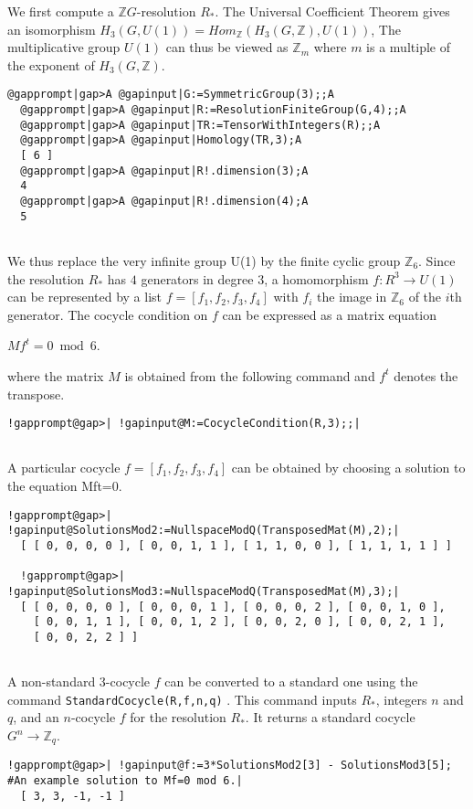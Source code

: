 \documentclass[a4paper,11pt]{report}
\begin{document}
{{ We first compute a $\mathbb ZG$-resolution $R_\ast$. The Universal Coefficient Theorem gives an isomorphism $H_3(G,U(1)) = Hom_{\mathbb Z}(H_3(G,\mathbb Z), U(1))$, The multiplicative group $U(1)$ can thus be viewed as $\mathbb Z_m$ where $m$ is a multiple of the exponent of $H_3(G,\mathbb Z)$. 
\begin{Verbatim}[commandchars=@|A,fontsize=\small,frame=single,label=Example]
  @gapprompt|gap>A @gapinput|G:=SymmetricGroup(3);;A
  @gapprompt|gap>A @gapinput|R:=ResolutionFiniteGroup(G,4);;A
  @gapprompt|gap>A @gapinput|TR:=TensorWithIntegers(R);;A
  @gapprompt|gap>A @gapinput|Homology(TR,3);A
  [ 6 ]
  @gapprompt|gap>A @gapinput|R!.dimension(3);A
  4
  @gapprompt|gap>A @gapinput|R!.dimension(4);A
  5
  
\end{Verbatim}
 

 We thus replace the very infinite group U(1) by the finite cyclic group $\mathbb Z_6$. Since the resolution $R_\ast $ has $4$ generators in degree $3$, a homomorphism $f\colon R^3\rightarrow U(1)$ can be represented by a list $f=[f_1, f_2, f_3, f_4]$ with $f_i$ the image in $\mathbb Z_6$ of the $i$th generator. The cocycle condition on $f$ can be expressed as a matrix equation 

$Mf^t = 0 \bmod 6$. 

 where the matrix $M$ is obtained from the following command and $f^t$ denotes the transpose. 
\begin{Verbatim}[commandchars=!@|,fontsize=\small,frame=single,label=Example]
  !gapprompt@gap>| !gapinput@M:=CocycleCondition(R,3);;|
  
\end{Verbatim}
 A particular cocycle $f=[f_1, f_2, f_3, f_4]$ can be obtained by choosing a solution to the equation
Mf\texttt{}t=0. 
\begin{Verbatim}[commandchars=!@|,fontsize=\small,frame=single,label=Example]
  !gapprompt@gap>| !gapinput@SolutionsMod2:=NullspaceModQ(TransposedMat(M),2);|
  [ [ 0, 0, 0, 0 ], [ 0, 0, 1, 1 ], [ 1, 1, 0, 0 ], [ 1, 1, 1, 1 ] ]
  
  !gapprompt@gap>| !gapinput@SolutionsMod3:=NullspaceModQ(TransposedMat(M),3);|
  [ [ 0, 0, 0, 0 ], [ 0, 0, 0, 1 ], [ 0, 0, 0, 2 ], [ 0, 0, 1, 0 ],
    [ 0, 0, 1, 1 ], [ 0, 0, 1, 2 ], [ 0, 0, 2, 0 ], [ 0, 0, 2, 1 ],
    [ 0, 0, 2, 2 ] ]
  
\end{Verbatim}
 A non-standard $3$-cocycle $f$ can be converted to a standard one using the command \texttt{StandardCocycle(R,f,n,q)} . This command inputs $ R_\ast$, integers $n$ and $q$, and an $n$-cocycle $f$ for the resolution $R_\ast$. It returns a standard cocycle $G^n \rightarrow \mathbb Z_q$. 
\begin{Verbatim}[commandchars=!@|,fontsize=\small,frame=single,label=Example]
  !gapprompt@gap>| !gapinput@f:=3*SolutionsMod2[3] - SolutionsMod3[5];   #An example solution to Mf=0 mod 6.|
  [ 3, 3, -1, -1 ]
  

\end{Verbatim}}}
\end{document}

